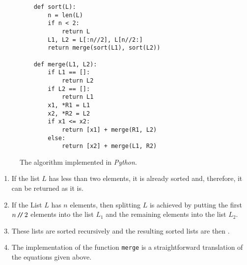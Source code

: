 \begin{figure}[!ht]
  \centering
\begin{verbatim}
    def sort(L):
        n = len(L)
        if n < 2:
            return L
        L1, L2 = L[:n//2], L[n//2:]
        return merge(sort(L1), sort(L2))
    
    def merge(L1, L2):
        if L1 == []:
            return L2
        if L2 == []:
            return L1
        x1, *R1 = L1
        x2, *R2 = L2
        if x1 <= x2:
            return [x1] + merge(R1, L2)
        else:
            return [x2] + merge(L1, R2)
\end{verbatim}
\vspace*{-0.3cm}
  \caption{The  algorithm implemented in \textsl{Python}.}
  \label{fig:merge-sort.stlx}
\end{figure}
\begin{enumerate}
\item If the list $L$ has less than two elements, it is already sorted and, therefore, it
      can be returned as it is.
\item If the List $L$ has $n$ elements, then splitting $L$ is achieved by putting the first $n\mbox{\,\texttt{/}$\!$\texttt{/}\,} 2$
      elements into the list $L_1$ and the remaining elements into the list $L_2$.
\item These lists are sorted recursively and the resulting sorted lists are then .
\item The implementation of the function \texttt{merge} is a straightforward translation of the equations
      given above.
\end{enumerate}

